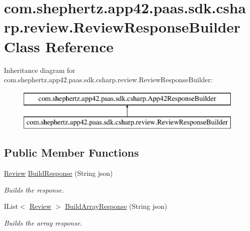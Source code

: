 \hypertarget{classcom_1_1shephertz_1_1app42_1_1paas_1_1sdk_1_1csharp_1_1review_1_1_review_response_builder}{\section{com.\+shephertz.\+app42.\+paas.\+sdk.\+csharp.\+review.\+Review\+Response\+Builder Class Reference}
\label{classcom_1_1shephertz_1_1app42_1_1paas_1_1sdk_1_1csharp_1_1review_1_1_review_response_builder}
}
Inheritance diagram for com.\+shephertz.\+app42.\+paas.\+sdk.\+csharp.\+review.\+Review\+Response\+Builder\+:\begin{figure}[H]
\begin{center}
\leavevmode
\includegraphics[height=2.000000cm]{classcom_1_1shephertz_1_1app42_1_1paas_1_1sdk_1_1csharp_1_1review_1_1_review_response_builder}
\end{center}
\end{figure}
\subsection*{Public Member Functions}
\begin{DoxyCompactItemize}
\item 
\hyperlink{classcom_1_1shephertz_1_1app42_1_1paas_1_1sdk_1_1csharp_1_1review_1_1_review}{Review} \hyperlink{classcom_1_1shephertz_1_1app42_1_1paas_1_1sdk_1_1csharp_1_1review_1_1_review_response_builder_aacae11e755e3682590ba82ff41708370}{Build\+Response} (String json)
\begin{DoxyCompactList}\small\item\em Builds the response. \end{DoxyCompactList}\item 
I\+List$<$ \hyperlink{classcom_1_1shephertz_1_1app42_1_1paas_1_1sdk_1_1csharp_1_1review_1_1_review}{Review} $>$ \hyperlink{classcom_1_1shephertz_1_1app42_1_1paas_1_1sdk_1_1csharp_1_1review_1_1_review_response_builder_a127de43c845db79a2633c2407291f093}{Build\+Array\+Response} (String json)
\begin{DoxyCompactList}\small\item\em Builds the array response. \end{DoxyCompactList}\end{DoxyCompactItemize}


